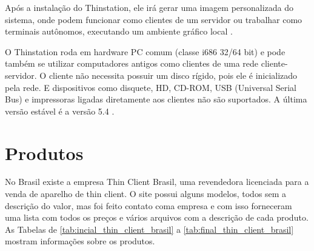 \documentclass[
	12pt,				%
	openright,			%
	twoside,			%
	a4paper,			%
	chapter=TITLE,		%
	english,			%
	brazil				%
	]{abntex2}
\begin{document}
Após a instalação do Thinstation, ele irá gerar uma imagem personalizada do sistema, onde podem funcionar como clientes de um servidor ou trabalhar como terminais autônomos, executando um ambiente gráfico local \cite{Thinstationl}.

O Thinstation roda em hardware PC comum (classe i686 32/64 bit) e pode também se utilizar computadores antigos como clientes de uma rede cliente-servidor. O cliente não necessita possuir um disco rígido, pois ele é inicializado pela rede. E dispositivos como disquete, HD, CD-ROM, USB (Universal Serial Bus) e impressoras ligadas diretamente aos clientes não são suportados. A última versão estável é a versão 5.4 \cite{Thinstationl,piaui}.


\section{Produtos}

No Brasil existe a empresa Thin Client Brasil, uma revendedora licenciada para a venda de aparelho de thin client. O site possui alguns modelos, todos sem a descrição do valor, mas foi feito contato coma empresa e com isso forneceram uma lista com todos os preços e vários arquivos com a descrição de cada produto. As Tabelas de \ref{tab:incial_thin_client_brasil} a \ref{tab:final_thin_client_brasil} mostram informações sobre os produtos.

 
\newpage

 \begin{table}[h!]
\end{table}
 
\end{document}
